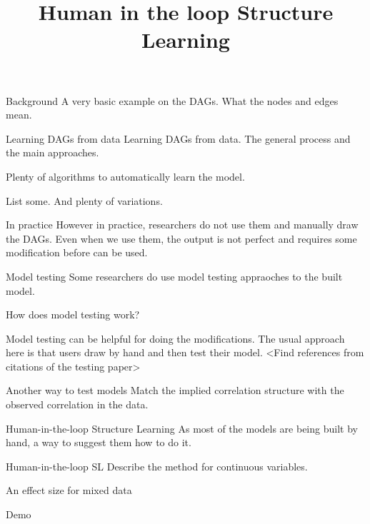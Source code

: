 \documentclass{beamer}
\begin{document}
\title[]{Human in the loop Structure Learning}
\date{}

\maketitle

\begin{frame}{Background}
	A very basic example on the DAGs.
	What the nodes and edges mean.
\end{frame}

\begin{frame}{Learning DAGs from data}
	Learning DAGs from data. The general process and the main approaches.

	Plenty of algorithms to automatically learn the model.

	List some. And plenty of variations.
\end{frame}

\begin{frame}{In practice}
	However in practice, researchers do not use them and manually draw the DAGs.
	Even when we use them, the output is not perfect and requires some modification 
		before can be used.
\end{frame}

\begin{frame}{Model testing}
	Some researchers do use model testing appraoches to the built model.

	How does model testing work?

	Model testing can be helpful for doing the modifications.
	The usual approach here is that users draw by hand and then test their model. <Find references from citations of the testing paper>
\end{frame}

\begin{frame}{Another way to test models}
	Match the implied correlation structure with the observed correlation in the data.
\end{frame}

\begin{frame}{Human-in-the-loop Structure Learning}
	As most of the models are being built by hand, a way to suggest them how to do it.
\end{frame}

\begin{frame}{Human-in-the-loop SL}
	Describe the method for continuous variables.
\end{frame}

\begin{frame}{An effect size for mixed data}
\end{frame}

\begin{frame}{Demo}
\end{frame}
\end{document}

